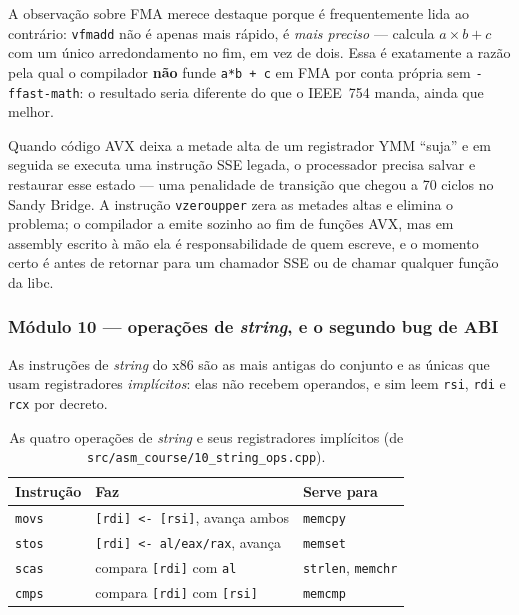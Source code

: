 A observação sobre FMA merece destaque porque é frequentemente lida ao
contrário: \texttt{vfmadd} não é apenas mais rápido, é \emph{mais preciso} ---
calcula $a \times b + c$ com um único arredondamento no fim, em vez de dois. Essa
é exatamente a razão pela qual o compilador \textbf{não} funde
\texttt{a*b + c} em FMA por conta própria sem \texttt{-ffast-math}: o resultado
seria diferente do que o IEEE~754 manda, ainda que melhor.

\begin{armadilha}
Quando código AVX deixa a metade alta de um registrador YMM ``suja'' e em
seguida se executa uma instrução SSE legada, o processador precisa salvar e
restaurar esse estado --- uma penalidade de transição que chegou a 70 ciclos no
Sandy Bridge. A instrução \texttt{vzeroupper} zera as metades altas e elimina o
problema; o compilador a emite sozinho ao fim de funções AVX, mas em assembly
escrito à mão ela é responsabilidade de quem escreve, e o momento certo é antes
de retornar para um chamador SSE ou de chamar qualquer função da libc.
\end{armadilha}

\subsubsection{Módulo 10 --- operações de \emph{string}, e o segundo bug de ABI}

As instruções de \emph{string} do x86 são as mais antigas do conjunto e as
únicas que usam registradores \emph{implícitos}: elas não recebem operandos, e
sim leem \texttt{rsi}, \texttt{rdi} e \texttt{rcx} por decreto.

\begin{table}[htbp]
\centering
\caption{As quatro operações de \emph{string} e seus registradores implícitos
         (de \texttt{src/asm\_course/10\_string\_ops.cpp}).}
\label{tab:string-ops}
\footnotesize
\begin{tabular}{@{}lll@{}}
\toprule
\textbf{Instrução} & \textbf{Faz} & \textbf{Serve para} \\
\midrule
\texttt{movs} & \texttt{[rdi] <- [rsi]}, avança ambos       & \texttt{memcpy} \\
\texttt{stos} & \texttt{[rdi] <- al/eax/rax}, avança        & \texttt{memset} \\
\texttt{scas} & compara \texttt{[rdi]} com \texttt{al}      & \texttt{strlen}, \texttt{memchr} \\
\texttt{cmps} & compara \texttt{[rdi]} com \texttt{[rsi]}   & \texttt{memcmp} \\
\bottomrule
\end{tabular}
\end{table}

